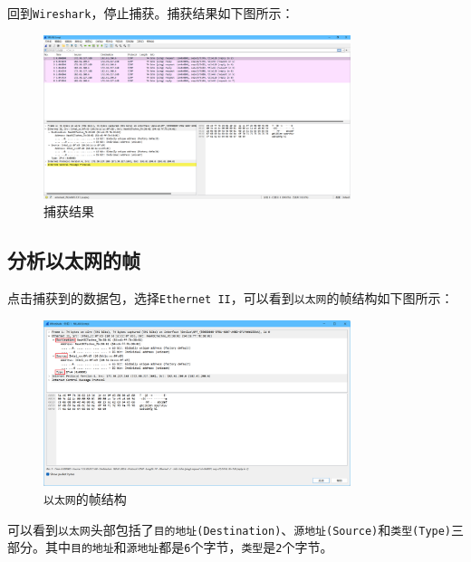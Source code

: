 \documentclass{article}
\begin{document}
回到\texttt{Wireshark}，停止捕获。捕获结果如下图所示：

\begin{figure}[H]
  \centering
  \includegraphics[width=0.8\textwidth]{images/04.png}
  \caption{捕获结果}
\end{figure}

\subsection{分析以太网的帧}

点击捕获到的数据包，选择\texttt{Ethernet II}，可以看到\texttt{以太网}的帧结构如下图所示：

\begin{figure}[H]
  \centering
  \includegraphics[width=0.8\textwidth]{images/05.png}
  \caption{\texttt{以太网}的帧结构}
\end{figure}

可以看到\texttt{以太网}头部包括了\texttt{目的地址(Destination)}、\texttt{源地址(Source)}和\texttt{类型(Type)}三部分。其中\texttt{目的地址}和\texttt{源地址}都是\texttt{6}个字节，\texttt{类型}是\texttt{2}个字节。
\end{document}
